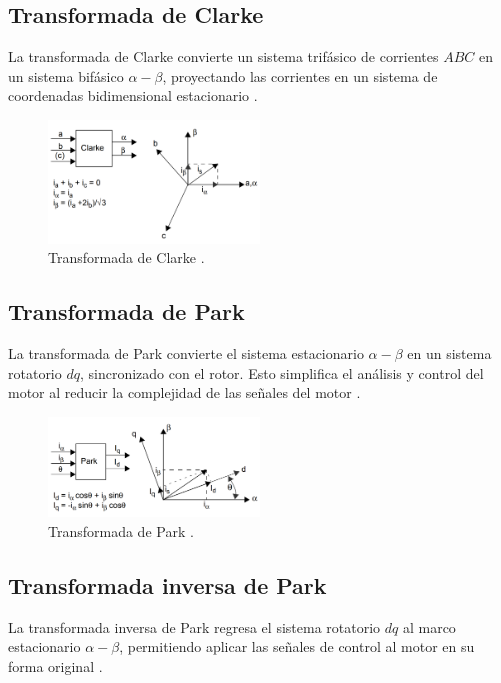 \documentclass[11pt]{report}
\begin{document}
\newpage
\subsection{Transformada de Clarke}
La transformada de Clarke convierte un sistema trifásico de corrientes \(ABC\) en un sistema bifásico \(\alpha-\beta\), proyectando las corrientes en un sistema de coordenadas bidimensional estacionario \cite{AN1078}.

\begin{figure}[ht]
    \centering
    \includegraphics[width=0.5\textwidth]{imagenes/clarke.png}
    \caption{Transformada de Clarke \cite{AN1078}.}
    \label{fig:clarke_transform}
\end{figure}
\FloatBarrier

\subsection{Transformada de Park}
La transformada de Park convierte el sistema estacionario \(\alpha-\beta\) en un sistema rotatorio \(dq\), sincronizado con el rotor. Esto simplifica el análisis y control del motor al reducir la complejidad de las señales del motor \cite{AN1078}.

\begin{figure}[ht]
    \centering
    \includegraphics[width=0.5\textwidth]{imagenes/park.png}
    \caption{Transformada de Park \cite{AN1078}.}
\end{figure}
\FloatBarrier

\subsection{Transformada inversa de Park}
La transformada inversa de Park regresa el sistema rotatorio \(dq\) al marco estacionario \(\alpha-\beta\), permitiendo aplicar las señales de control al motor en su forma original \cite{AN1078}.
\end{document}
